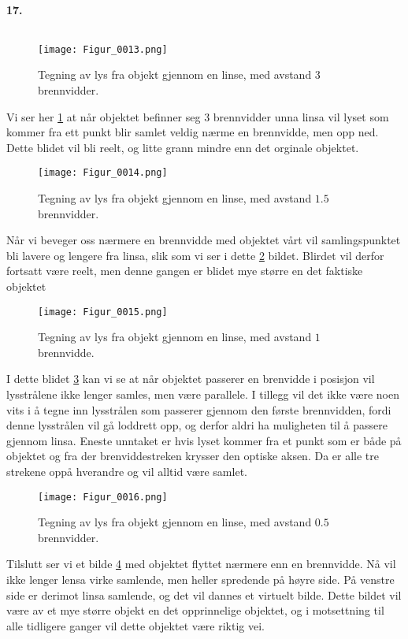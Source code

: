 \documentclass[11pt, A4paper,norsk]{article}
\begin{document}
		\paragraph{17.} $ $
			\begin{figure}[H]
\label{13}
\texttt{[image: Figur\_0013.png]}
\caption{Tegning av lys fra objekt gjennom en linse, med avstand $3$ brennvidder.}
			\end{figure}
			\begin{flushleft}
Vi ser her \ref{13} at når objektet befinner seg $3$ brennvidder unna linsa vil lyset som kommer fra ett punkt blir samlet veldig nærme en brennvidde, men opp ned. Dette blidet vil bli reelt, og litte grann mindre enn det orginale objektet.
			\end{flushleft}
			\begin{figure}[H]
\label{14}
\texttt{[image: Figur\_0014.png]}
\caption{Tegning av lys fra objekt gjennom en linse, med avstand $1.5$ brennvidder.}
			\end{figure}
			\begin{flushleft}
Når vi beveger oss nærmere en brennvidde med objektet vårt vil samlingspunktet bli lavere og lengere fra linsa, slik som vi ser i dette \ref{14} bildet. Blirdet vil derfor fortsatt være reelt, men denne gangen er blidet mye større en det faktiske objektet
			\end{flushleft}
			\begin{figure}[H]
\label{15}
\texttt{[image: Figur\_0015.png]}
\caption{Tegning av lys fra objekt gjennom en linse, med avstand $1$ brennvidde.}
			\end{figure}
			\begin{flushleft}
I dette blidet \ref{15} kan vi se at når objektet passerer en brenvidde i posisjon vil lysstrålene ikke lenger samles, men være parallele. I tillegg vil det ikke være noen vits i å tegne inn lysstrålen som passerer gjennom den første brennvidden, fordi denne lysstrålen vil gå loddrett opp, og derfor aldri ha muligheten til å passere gjennom linsa. Eneste unntaket er hvis lyset kommer fra et punkt som er både på objektet og fra der brenviddestreken krysser den optiske aksen. Da er alle tre strekene oppå hverandre og vil alltid være samlet.
			\end{flushleft}
			\begin{figure}[H]
\label{16}
\texttt{[image: Figur\_0016.png]}
\caption{Tegning av lys fra objekt gjennom en linse, med avstand $0.5$ brennvidder.}
			\end{figure}
			\begin{flushleft}
Tilslutt ser vi et bilde \ref{16} med objektet flyttet nærmere enn en brennvidde. Nå vil ikke lenger lensa virke samlende, men heller spredende på høyre side. På venstre side er derimot linsa samlende, og det vil dannes et virtuelt bilde. Dette bildet vil være av et mye større objekt en det opprinnelige objektet, og i motsettning til alle tidligere ganger vil dette objektet være riktig vei.
			\end{flushleft}
\end{document}
